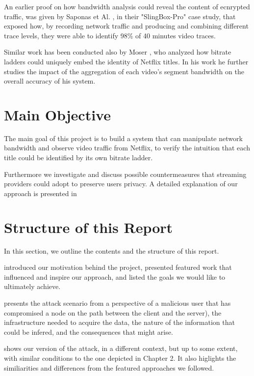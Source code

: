 An earlier proof on how bandwidth analysis could reveal the content of
ecnrypted traffic, was given by Saponas et Al. \cite{Saponas2007devices}, in
their "SlingBox-Pro" case study, that exposed how, by recording network traffic
and producing and combining different trace levels, they were able to identify
98\% of 40 minutes video traces.

Similar work has been conducted also by Moser \cite{moser}, who analyzed how
bitrate ladders could uniquely embed the identity of Netflix titles. In his
work he further studies the impact of the aggregation of each video's segment
bandwidth on the overall accuracy of his system. 

\section{Main Objective}\label{sec:objective}

The main goal of this project is to build a system that can manipulate network
bandwidth and observe video traffic from Netflix, to verify the intuition that
each title could be identified by its own bitrate ladder. 

Furthermore we investigate and discuss possible countermeasures that streaming
providers could adopt to preserve users privacy. A detailed explanation of our
approach is presented in 

\section{Structure of this Report}\label{sec:structure}
  
In this section, we outline the contents and the structure of this report.

 introduced our motivation behind the project, presented featured work
that influenced and inspire our approach, and listed the goals we would like to
ultimately achieve.

 presents the attack scenario from a perspective of a
malicious user that has compromised a node on the path between the client and
the server), the infrastructure needed to acquire the data, the nature of the
information that could be infered, and the consequences that might arise.

 shows our version of the attack, in a different context, but up to
some extent, with similar conditions to the one depicted in Chapter 2. It also
higlights the similiarities and differences from the featured approaches we
followed.

